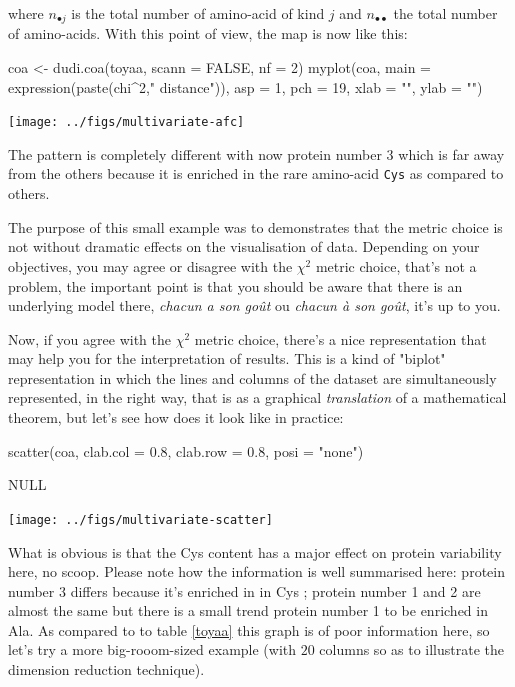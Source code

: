 \documentclass{article}
\begin{document}
where $n_{{\bullet}j}$ is the total number of amino-acid of kind $j$ and
$n_{\bullet\bullet}$ the total number of amino-acids. With this point
of view, the map is now like this:

\begin{Schunk}
\begin{Sinput}
 coa <- dudi.coa(toyaa, scann = FALSE, nf = 2)
 myplot(coa, main = expression(paste(chi^2," distance")), 
   asp = 1, pch = 19, xlab = "", ylab = "")
\end{Sinput}
\end{Schunk}
\texttt{[image: ../figs/multivariate-afc]}

The pattern is completely different with now protein number 3 which is far away from
the others because it is enriched in the rare amino-acid \texttt{Cys} as compared to
others.

The purpose of this small example was to demonstrates that the metric choice
is not without dramatic effects on the visualisation of data. Depending on your
objectives, you may agree or disagree with the $\chi^2$ metric choice, that's
not a problem, the important point is that you should be aware that there is
an underlying model there, \textit{chacun a son go{\^u}t} ou 
\textit{chacun {\`a} son go{\^u}t}, it's up to you.

Now, if you agree with the  $\chi^2$ metric choice, there's a nice
representation that may help you for the interpretation of results. 
This is a kind of "biplot" representation in which the lines and
columns of the dataset are simultaneously represented, in the
right way, that is as a graphical \textit{translation} of a 
mathematical theorem, but let's see how does it look like in practice: 

\begin{Schunk}
\begin{Sinput}
 scatter(coa, clab.col = 0.8, clab.row = 0.8, posi = "none")
\end{Sinput}
\begin{Soutput}
NULL
\end{Soutput}
\end{Schunk}
\texttt{[image: ../figs/multivariate-scatter]}

What is obvious is that the Cys content has a major effect on protein
variability here, no scoop. Please note how the information is well
summarised here: protein number 3 differs because it's enriched in
in Cys ; protein number 1 and 2 are almost the same but there is a
small trend protein number 1 to be enriched in Ala. As compared to
to table \ref{toyaa} this graph is of poor information here, so let's
try a more big-rooom-sized example (with $20$ columns so as to
illustrate the dimension reduction technique).
\end{document}
